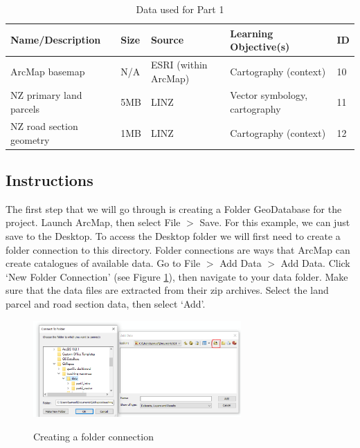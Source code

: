 \documentclass{article}
\begin{document}
\begin{table}[h]
\begin{center}
    \begin{tabular}{ | m{4cm} | m{1cm}| m{3.5cm} | m{5cm} | m{1cm} | } 
    \hline
    \cellcolor{red!35!blue!33!green!33!}\textbf{Name/Description} & 
    \cellcolor{red!35!blue!33!green!33!}\textbf{Size} &
    \cellcolor{red!35!blue!33!green!33!}\textbf{Source} &
    \cellcolor{red!35!blue!33!green!33!}\textbf{Learning Objective(s)} &
    \cellcolor{red!35!blue!33!green!33!}\textbf{ID} \\
    \hline
    ArcMap basemap & N/A & ESRI (within ArcMap) & Cartography (context) & 10 \\
    \hline
    NZ primary land parcels & 5MB & LINZ & Vector symbology, cartography & 11 \\
    \hline
    NZ road section geometry & 1MB & LINZ & Cartography (context) & 12 \\
    \hline
    \end{tabular}
\end{center}
\caption{\label{tb_data_1}Data used for Part 1}
\end{table}

\subsection{Instructions}
The first step that we will go through is creating a Folder GeoDatabase for the project. Launch ArcMap, then select File $>$ Save. For this example, we can just save to the Desktop. To access the Desktop folder we will first need to create a folder connection to this directory. Folder connections are ways that ArcMap can create catalogues of available data. Go to File $>$ Add Data $>$ Add Data. Click `New Folder Connection' (see Figure \ref{folderconnection}), then navigate to your data folder. Make sure that the data files are extracted from their zip archives. Select the land parcel and road section data, then select `Add'. \\

\begin{figure}[h]
  \centering
  \caption{Creating a folder connection}
  \includegraphics[width=300px]{images/part1/folderconnection.PNG}
  \label{folderconnection}
\end{figure}
\end{document}
